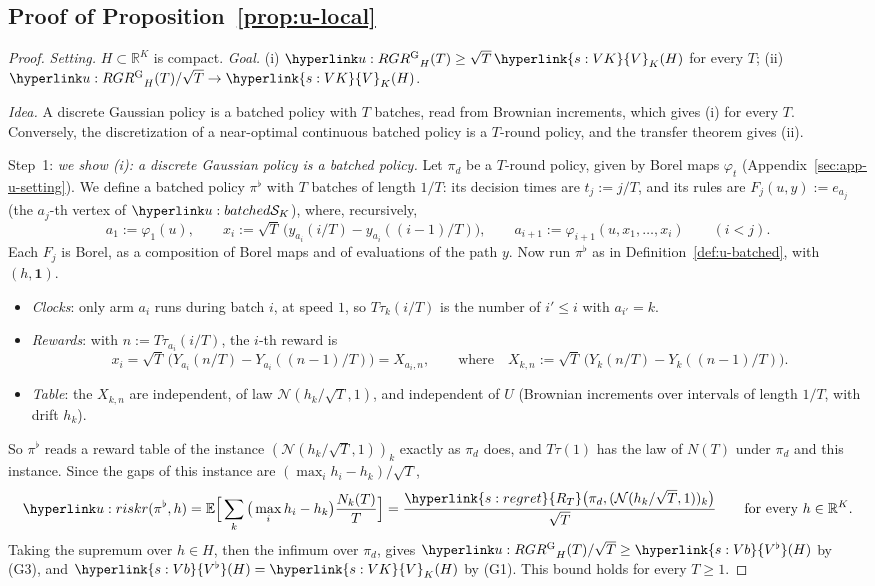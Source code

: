 \documentclass[11pt]{article}
\DeclareRobustCommand{\sy}[2]{{\hyperlink{#1}{#2}}}
\newcommand{\R}{\mathbb{R}}
\newcommand{\E}{\mathbb{E}}
\newcommand{\1}{\mathbf{1}}
\newcommand{\RT}{\sy{s:regret}{R_T}}
\newcommand{\VK}{\sy{s:VK}{V}}
\newcommand{\Vb}{\sy{s:Vb}{V^\flat}}
\begin{document}
\subsection{Proof of Proposition~\ref{prop:u-local}}
\begin{proof}
\textit{Setting.} $H\subset\R^K$ is compact. \textit{Goal.} (i) $\uRG_H(T)\ge\sqrt T\,\VK_K(H)$ for every $T$; (ii) $\uRG_H(T)/\sqrt T\to\VK_K(H)$.

\textit{Idea.} A discrete Gaussian policy is a batched policy with $T$ batches, read from Brownian increments, which gives (i) for every $T$. Conversely, the
discretization of a near-optimal continuous batched policy is a $T$-round policy, and the transfer theorem gives (ii).

Step~1: \emph{we show (i): a discrete Gaussian policy is a batched policy.} Let $\pi_d$ be a $T$-round policy, given by Borel maps $\varphi_t$
(Appendix~\ref{sec:app-u-setting}). We define a batched policy $\pi^\flat$ with $T$ batches of length $1/T$: its decision times are $t_j:=j/T$, and its rules are
$F_j(u,y):=e_{a_j}$ (the $a_j$-th vertex of $\uSimp$), where, recursively,
\[
a_1:=\varphi_1(u),\qquad x_i:=\sqrt T\,\big(y_{a_i}(i/T)-y_{a_i}((i-1)/T)\big),\qquad a_{i+1}:=\varphi_{i+1}(u,x_1,\dots,x_i)\qquad(i<j).
\]
Each $F_j$ is Borel, as a composition of Borel maps and of evaluations of the path $y$. Now run $\pi^\flat$ as in Definition~\ref{def:u-batched}, with $(h,\mathbf 1)$.
\begin{itemize}
\item \emph{Clocks}: only arm $a_i$ runs during batch $i$, at speed $1$, so $T\tau_k(i/T)$ is the number of $i'\le i$ with $a_{i'}=k$.
\item \emph{Rewards}: with $n:=T\tau_{a_i}(i/T)$, the $i$-th reward is
\[
x_i=\sqrt T\,\big(Y_{a_i}(n/T)-Y_{a_i}((n-1)/T)\big)=X_{a_i,n},\qquad\text{where}\quad X_{k,n}:=\sqrt T\,\big(Y_k(n/T)-Y_k((n-1)/T)\big).
\]
\item \emph{Table}: the $X_{k,n}$ are independent, of law $\mathcal N(h_k/\sqrt T,1)$, and independent of $U$ (Brownian increments over intervals of length $1/T$, with
drift $h_k$).
\end{itemize}
So $\pi^\flat$ reads a reward table of the instance $(\mathcal N(h_k/\sqrt T,1))_k$ exactly as $\pi_d$ does, and $T\tau(1)$ has the law of $N(T)$ under $\pi_d$ and
this instance. Since the gaps of this instance are $(\max_ih_i-h_k)/\sqrt T$,
\[
\urk(\pi^\flat,h)=\E\Big[\sum_k\big(\max_ih_i-h_k\big)\frac{N_k(T)}T\Big]=\frac{\RT\big(\pi_d,(\mathcal N(h_k/\sqrt T,1))_k\big)}{\sqrt T}\qquad\text{for every }h\in\R^K .
\]
Taking the supremum over $h\in H$, then the infimum over $\pi_d$, gives $\uRG_H(T)/\sqrt T\ge\Vb(H)$ by (G3), and $\Vb(H)=\VK_K(H)$ by (G1). This bound holds for every
$T\ge1$.


\end{proof}
\end{document}
